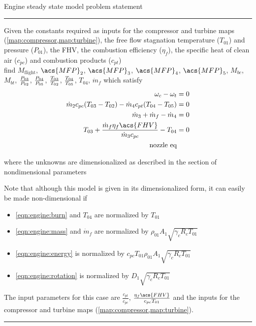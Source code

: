 \documentclass[tcc]{subfiles}
\begin{document}
\begin{table}
\centering
    \caption{Engine steady state model problem statement}
    \label{map:engine}
\begin{minipage}{0.7\textwidth}
    \hrule\vspace{2pt}

    Given the constants required as inputs for the compressor and turbine maps (\cref{map:compressor,map:turbine}), 
    the free flow stagnation temperature ($T_{01}$) and pressure ($P_{01}$), 
    the \acf{FHV}, the combustion efficiency ($\eta_f$),
    the specific heat of clean air ($c_{pc}$) and combustion products ($c_{pt}$) \\ 
    find $M_\text{flight}$, $\acs{MFP}_2$, $\acs{MFP}_3$, $\acs{MFP}_4$, $\acs{MFP}_5$, $M_{bc}$, $M_{bt}$, $\frac{P_{03}}{P_{02}}$, $\frac{P_{04}}{P_{05}}$, $\frac{T_{03}}{T_{02}}$, $\frac{T_{04}}{T_{05}}$, $T_{04}$, $\dot{m}_f$
    which satisfy
\begin{align}
    \omega_c - \omega_t &= 0 \label{eqn:engine:rotation} \\
    \dot{m}_2 c_{pc} (T_{03}-T_{02}) - \dot{m}_4 c_{pt}(T_{04}-T_{05}) &= 0 \label{eqn:engine:energy}\\
    \dot{m}_3 + \dot{m}_f - \dot{m}_4 &= 0 \label{eqn:engine:mass} \\
    T_{03} + \frac{\dot{m}_f \eta_f \acs{FHV}}{\dot{m}_3 c_{pc}} - T_{04} &= 0 \label{eqn:engine:burn} \\
    \text{nozzle eq}
\end{align}
    
where the unknowns are dimensionalized as described in the section of nondimensional parameters

Note that although this model is given in its dimensionalized form, it can easily be made non-dimensional if
\begin{itemize}
    \item \cref{eqn:engine:burn} and $T_{04}$ are normalized by $T_{01}$
    \item \cref{eqn:engine:mass} and $\dot{m}_f$ are normalized by $\rho_{01} A_1 \sqrt{\gamma_c R_c T_{01}}$
    \item \cref{eqn:engine:energy} is normalized by $c_{pc} T_{01} \rho_{01} A_1 \sqrt{\gamma_c R_c T_{01}}$
    \item \cref{eqn:engine:rotation} is normalized by $D_1\sqrt{\gamma_c R_c T_{01}}$
\end{itemize}
    The input parameters for this case are $\frac{c_{pt}}{c_{pc}}$, $\frac{\eta_f \acs{FHV}}{c_{pc} T_{01}}$ 
and the inputs for the compressor and turbine maps (\cref{map:compressor,map:turbine}).

    \hrule
\end{minipage}
\end{table}
\end{document}
